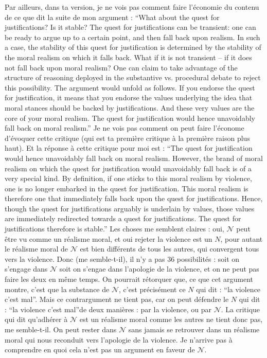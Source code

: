 \documentclass[preprint, french, english, 11pt, authoryear]{elsarticle}%
\newcommand{\adv}{\mathscr{N}}
\begin{document}
{Par ailleurs, dans ta version, je ne vois pas comment faire l'économie du contenu de ce que dit la suite de mon argument :
``What about the quest for justifications? Is it stable? The quest for justifications can be transient: one can be ready to argue up to a certain point, and then fall back upon realism. In such a case, the stability of this quest for justification is determined by the stability of the moral realism on which it falls back. What if it is not transient -- if it does not fall back upon moral realism? One can claim to take advantage of the structure of reasoning deployed in the substantive vs. procedural debate to reject this possibility. The argument would unfold as follows. If you endorse the quest for justification, it means that you endorse the values underlying the idea that moral stances should be backed by justifications. And these very values are the core of your moral realism. The quest for justification would hence unavoidably fall back on moral realism.''
Je ne vois pas comment on peut faire l'économe d'évoquer cette critique (qui est ta première critique à la première raison plus haut). Et la réponse à cette critique pour moi est :
``The quest for justification would hence unavoidably fall back on moral realism. However, the brand of moral realism on which the quest for justification would unavoidably fall back is of a very special kind. By definition, if one sticks to this moral realism by violence, one is no longer embarked in the quest for justification. This moral realism is therefore one that immediately falls back upon the quest for justifications. Hence, though the quest for justifications arguably is underlain by values, those values are immediately redirected towards a quest for justifications. The quest for justifications therefore is stable.''
Les choses me semblent claires : oui, $\adv$ peut être vu comme un réalisme moral, et oui rejeter la violence est un $N$, pour autant le réalisme moral de $\adv$ est bien différents de tous les autres, qui convergent tous vers la violence. Donc (me semble-t-il), il n'y a pas 36 possibilités : soit on s'engage dans $\adv$ soit on s'engae dans l'apologie de la violence, et on ne peut pas faire les deux en même temps. On pourrait rétorquer que, ce que cet argument montre, c'est que la substance de $\adv$, c'est précisément ce $N$ qui dit : ``la violence c'est mal''. Mais ce contrargument ne tient pas, car on peut défendre le $N$ qui dit : ``la violence c'est mal''de deux manières : par la violence, ou par $\adv$. La critique qui dit qu'adhérer à $\adv$ est un réalisme moral comme les autres ne tient donc pas, me semble-t-il. On peut rester dans $\adv$ sans jamais se retrouver dans un réalisme moral qui nous reconduit vers l'apologie de la violence. Je n'arrive pas à comprendre en quoi cela n'est pas un argument en faveur de $\adv$.}
\end{document}
